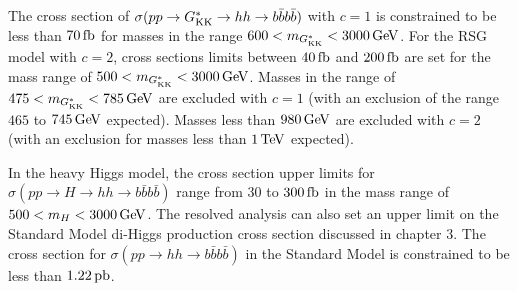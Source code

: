 The cross section of $\sigma(pp \to G^*_{\rm KK} \to hh \to b\bar{b}b\bar{b})$ with $c=1$ is constrained to be less than $70 \mbox{\,fb}$ for masses in the range $600 < m_{\Gkk} < 3000 \GeV$. For the RSG model with $c=2$, cross sections limits between $40\mbox{\,fb}$ and $200 \mbox{\,fb}$ are set for the mass range of $500 < m_{\Gkk} < 3000 \GeV$. Masses in the range of $475 < m_{\Gkk} < 785 \GeV$ are excluded with $c=1$ (with an exclusion of the range $465$ to $745 \GeV$ expected). Masses less than $980 \GeV$ are excluded with $c=2$ (with an exclusion for masses less than $1 \TeV$ expected). 

In the heavy Higgs model, the cross section upper limits for $\sigma(pp \to H \to hh \to b\bar{b}b\bar{b})$ range from $30$ to $300 \mbox{\,fb}$ in the mass range of $500 < m_{H} < 3000 \GeV$. 
%
The resolved analysis can also set an upper limit on the Standard Model di-Higgs production cross section discussed in chapter 3. The cross section for $\sigma(pp \to hh \to b\bar{b}b\bar{b})$ in the Standard Model is constrained to be less than $1.22 \mbox{\,pb}$. 



